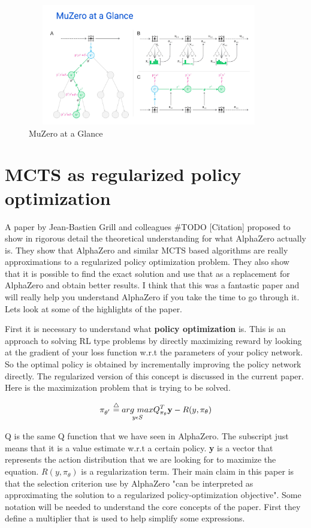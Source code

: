 \begin{figure}[H]
       \centering
       \includegraphics[width=400px,height=200px]{images/muzero_planning.png}
       \caption{MuZero at a Glance}
       \label{fig:my_label}
\end{figure}


\section{MCTS as regularized policy optimization}

A paper by Jean-Bastien Grill and colleagues #TODO [Citation] proposed to show in rigorous detail the theoretical understanding for what AlphaZero actually is. They show that AlphaZero and similar MCTS based algorithms are really approximations to a regularized policy optimization problem. They also show that it is possible to find the exact solution and use that as a replacement for AlphaZero and obtain better results. I think that this was a fantastic paper and will really help you understand AlphaZero if you take the time to go through it. Lets look at some of the highlights of the paper. 

First it is necessary to understand what \textbf{policy optimization} is. This is an approach to solving RL type problems by directly maximizing reward by looking at the gradient of your loss function w.r.t the parameters of your policy network. So the optimal policy is obtained by incrementally improving the policy network directly. The regularized version of this concept is discussed in the current paper. Here is the maximization problem that is trying to be solved.

\begin{equation}
    \pi_{\theta^{'}} \overset{\triangle}{=} \underset{y \epsilon S}{arg \ max} Q_{\pi_{\theta}}^{T}\textbf{y} - R(y,\pi_{\theta})
\end{equation}

Q is the same Q function that we have seen in AlphaZero. The subscript just means that it is a value estimate w.r.t a certain policy. \textbf{y} is a vector that represents the action distribution that we are looking for to maximize the equation. $R(y,\pi_\theta)$ is a regularization term. Their main claim in this paper is that the selection criterion use by AlphaZero "can be interpreted as approximating the solution to a regularized policy-optimization objective". Some notation will be needed to understand the core concepts of the paper. First they define a multiplier that is used to help simplify some expressions. 

